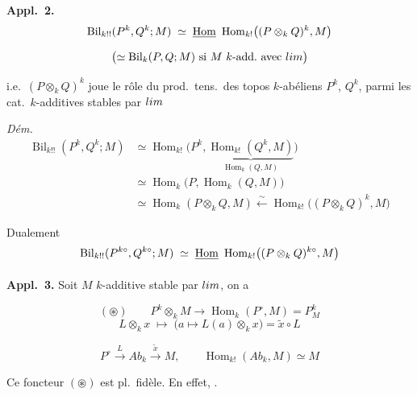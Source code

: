\documentclass[11pt,a4paper]{article}
\begin{document}
\textbf{Appl.\ 2.}
\[
\operatorname{Bil}_{k!!}(P^{k}, Q^{k}; M) \;\simeq\;
\struck{\operatorname{Hom}}\ \operatorname{Hom}_{k!}\bigl((P \otimes_k Q)^{k}, M\bigr)
\]
\[
\bigl(\simeq \operatorname{Bil}_k(P, Q; M) \text{ si $M$ $k$-add.\ avec }
\varinjlim\bigr)
\]


i.e.\ $(P \otimes_k Q)^{k}$ joue le rôle du prod.\ tens.\ des topos
$k$-abéliens $P^{k}$, $Q^{k}$, parmi les cat.\ $k$-additives stables par
$\varinjlim$


\emph{Dém.}
\[
\begin{aligned}
\operatorname{Bil}_{k!!}(P^{k}, Q^{k}; M)
 &\simeq \operatorname{Hom}_{k!}\bigl(P^{k},
    \underbrace{\operatorname{Hom}_{k!}(Q^{k}, M)}_{\textstyle
    \operatorname{Hom}_k(Q, M)}\bigr) \\
 &\simeq \operatorname{Hom}_k\bigl(P, \operatorname{Hom}_k(Q, M)\bigr) \\
 &\simeq \operatorname{Hom}_k(P \otimes_k Q, M)
    \overset{\sim}{\longleftarrow}
    \operatorname{Hom}_{k!}\bigl((P \otimes_k Q)^{k}, M\bigr)
\end{aligned}
\]

Dualement
\[
\operatorname{Bil}_{k!!}(P^{k\circ}, Q^{k\circ}; M) \;\simeq\;
\struck{\operatorname{Hom}}\ \operatorname{Hom}_{k!}\bigl(
(P \otimes_k Q)^{k\circ}, M\bigr)
\]


\textbf{Appl.\ 3.} Soit $M$ $k$-additive stable par $\varinjlim$, on a

\[
(\circledast) \qquad
P^{k} \otimes_k M \longrightarrow \operatorname{Hom}_k(P^{\circ}, M) = P^{k}_{M}
\]
\[
L \otimes_k x \;\longmapsto\; \bigl(a \mapsto L(a) \otimes_k x\bigr)
= \widetilde{x} \circ L
\]


\[
P^{\circ} \overset{L}{\longrightarrow} Ab_k
\overset{\widetilde{x}}{\longrightarrow} M ,
\qquad \operatorname{Hom}_{k!}(Ab_k, M) \simeq M
\]

Ce foncteur $(\circledast)$ est pl.\ fidèle. En effet, .

\end{document}
